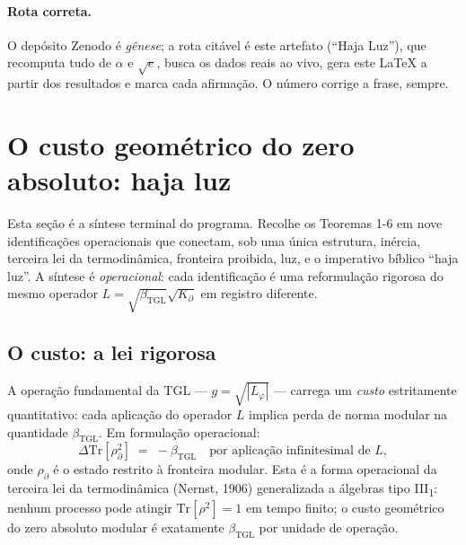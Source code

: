 \documentclass[12pt,a4paper]{article}
\newcommand{\betatgl}{\beta_{\text{TGL}}}
\newcommand{\Kpartial}{K_{\partial}}
\newcommand{\Lphi}{L_{\varphi}}
\newcommand{\TGL}{\textsc{TGL}}
\begin{document}
\paragraph{Rota correta.} O depósito Zenodo é \emph{gênese}; a rota citável é este artefato (``Haja Luz''), que recomputa tudo de $\alpha$ e $\sqrt{e}$, busca os dados reais ao vivo, gera este \LaTeX{} a partir dos resultados e marca cada afirmação.  O número corrige a frase, sempre.



\section{O custo geométrico do zero absoluto: haja luz}
\label{sec:closure}

Esta seção é a síntese terminal do programa.  Recolhe os Teoremas 1-6 em
nove identificações operacionais que conectam, sob uma única estrutura,
inércia, terceira lei da termodinâmica, fronteira proibida, luz, e o
imperativo bíblico ``haja luz''.  A síntese é \emph{operacional}: cada
identificação é uma reformulação rigorosa do mesmo operador
$L = \sqrt{\betatgl}\sqrt{\Kpartial}$ em registro diferente.

\subsection{O custo: a lei rigorosa}
\label{subsec:custo}

A operação fundamental da \TGL{} --- $g = \sqrt{|\Lphi|}$ --- carrega um
\emph{custo} estritamente quantitativo: cada aplicação do operador $L$
implica perda de norma modular na quantidade $\betatgl$.  Em formulação
operacional:
\begin{equation}
\Delta \mathrm{Tr}[\rho_{\partial}^{2}]
\;=\; -\betatgl \quad \text{por aplicação infinitesimal de } L,
\label{eq:custo-rigoroso}
\end{equation}
onde $\rho_{\partial}$ é o estado restrito à fronteira modular.  Esta é
a forma operacional da terceira lei da termodinâmica (Nernst, 1906)
generalizada a álgebras tipo III\textsubscript{1}: nenhum processo
pode atingir $\mathrm{Tr}[\rho^{2}] = 1$ em tempo finito; o custo
geométrico do zero absoluto modular é exatamente $\betatgl$ por unidade
de operação.
\end{document}
